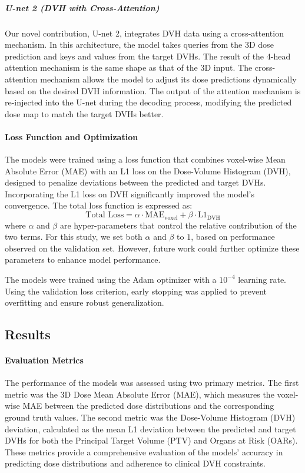 \subparagraph{U-net 2 (DVH with Cross-Attention)}
Our novel contribution, U-net 2, integrates DVH data using a cross-attention mechanism.
In this architecture, the model takes queries from the 3D dose prediction and keys and values from the target DVHs.
The result of the 4-head attention mechanism is the same shape as that of the 3D input.
The cross-attention mechanism allows the model to adjust its dose predictions dynamically based on the desired DVH information.
The output of the attention mechanism is re-injected into the U-net during the decoding process, modifying the predicted dose map to match the target DVHs better.

\paragraph{Loss Function and Optimization}
The models were trained using a loss function that combines voxel-wise Mean Absolute Error (MAE) with an L1 loss on the Dose-Volume Histogram (DVH), designed to penalize deviations between the predicted and target DVHs.
Incorporating the L1 loss on DVH significantly improved the model’s convergence.
The total loss function is expressed as:
$$
\text{Total Loss} = \alpha \cdot \text{MAE}_{\text{voxel}} + \beta \cdot \text{L1}_{\text{DVH}}
$$
where $\alpha$ and $\beta$ are hyper-parameters that control the relative contribution of the two terms.
For this study, we set both $\alpha$ and $\beta$ to $1$, based on performance observed on the validation set.
However, future work could further optimize these parameters to enhance model performance.

The models were trained using the Adam optimizer with a $10^{-4}$ learning rate.
Using the validation loss criterion, early stopping was applied to prevent overfitting and ensure robust generalization.

\subsection{Results}
\paragraph{Evaluation Metrics}  
The performance of the models was assessed using two primary metrics.
The first metric was the 3D Dose Mean Absolute Error (MAE), which measures the voxel-wise MAE between the predicted dose distributions and the corresponding ground truth values.
The second metric was the Dose-Volume Histogram (DVH) deviation, calculated as the mean L1 deviation between the predicted and target DVHs for both the Principal Target Volume (PTV) and Organs at Risk (OARs).
These metrics provide a comprehensive evaluation of the models' accuracy in predicting dose distributions and adherence to clinical DVH constraints.

